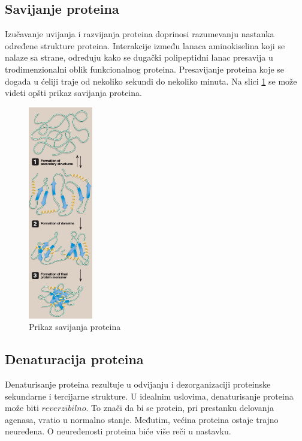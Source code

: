 \subsection{Savijanje proteina}
Izučavanje uvijanja i razvijanja proteina doprinosi razumevanju nastanka određene strukture proteina. Interakcije između lanaca aminokiselina koji se nalaze sa strane, određuju kako se dugački polipeptidni lanac presavija u trodimenzionalni oblik funkcionalnog proteina. Presavijanje proteina koje se događa u ćeliji traje od nekoliko sekundi do nekoliko minuta. 
Na slici \ref{fig:folding} se može videti opšti prikaz savijanja proteina.
\begin{figure}[h]
	\centering
    \includegraphics[width=0.25\textwidth]{Figures/BO/protein_folding.png}
    \caption{Prikaz savijanja proteina~\cite{lippincott}}
    \label{fig:folding}
\end{figure}


\subsection{Denaturacija proteina}
Denaturisanje proteina rezultuje u odvijanju i dezorganizaciji proteinske sekundarne i tercijarne strukture. U idealnim uslovima, denaturisanje proteina može biti $reverzibilno$. To znači da bi se protein, pri prestanku delovanja agenasa, vratio u normalno stanje. Međutim, većina proteina ostaje trajno neuređena. O neuređenosti proteina biće više reči u nastavku.\\

